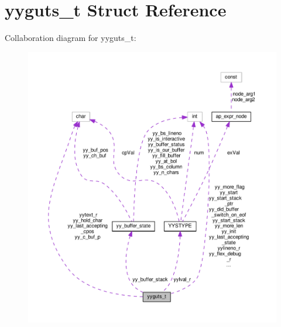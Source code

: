 \hypertarget{structyyguts__t}{}\section{yyguts\+\_\+t Struct Reference}
\label{structyyguts__t}


Collaboration diagram for yyguts\+\_\+t\+:
\nopagebreak
\begin{figure}[H]
\begin{center}
\leavevmode
\includegraphics[width=350pt]{structyyguts__t__coll__graph}
\end{center}
\end{figure}
